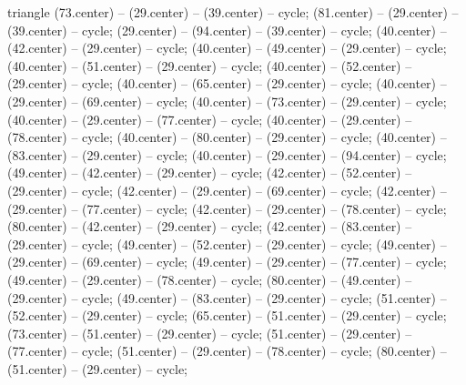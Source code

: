 \begin{pgfonlayer}{triangle}
 (73.center) -- (29.center) -- (39.center) -- cycle; 
 (81.center) -- (29.center) -- (39.center) -- cycle; 
 (29.center) -- (94.center) -- (39.center) -- cycle; 
 (40.center) -- (42.center) -- (29.center) -- cycle; 
 (40.center) -- (49.center) -- (29.center) -- cycle; 
 (40.center) -- (51.center) -- (29.center) -- cycle; 
 (40.center) -- (52.center) -- (29.center) -- cycle; 
 (40.center) -- (65.center) -- (29.center) -- cycle; 
 (40.center) -- (29.center) -- (69.center) -- cycle; 
 (40.center) -- (73.center) -- (29.center) -- cycle; 
 (40.center) -- (29.center) -- (77.center) -- cycle; 
 (40.center) -- (29.center) -- (78.center) -- cycle; 
 (40.center) -- (80.center) -- (29.center) -- cycle; 
 (40.center) -- (83.center) -- (29.center) -- cycle; 
 (40.center) -- (29.center) -- (94.center) -- cycle; 
 (49.center) -- (42.center) -- (29.center) -- cycle; 
 (42.center) -- (52.center) -- (29.center) -- cycle; 
 (42.center) -- (29.center) -- (69.center) -- cycle; 
 (42.center) -- (29.center) -- (77.center) -- cycle; 
 (42.center) -- (29.center) -- (78.center) -- cycle; 
 (80.center) -- (42.center) -- (29.center) -- cycle; 
 (42.center) -- (83.center) -- (29.center) -- cycle; 
 (49.center) -- (52.center) -- (29.center) -- cycle; 
 (49.center) -- (29.center) -- (69.center) -- cycle; 
 (49.center) -- (29.center) -- (77.center) -- cycle; 
 (49.center) -- (29.center) -- (78.center) -- cycle; 
 (80.center) -- (49.center) -- (29.center) -- cycle; 
 (49.center) -- (83.center) -- (29.center) -- cycle; 
 (51.center) -- (52.center) -- (29.center) -- cycle; 
 (65.center) -- (51.center) -- (29.center) -- cycle; 
 (73.center) -- (51.center) -- (29.center) -- cycle; 
 (51.center) -- (29.center) -- (77.center) -- cycle; 
 (51.center) -- (29.center) -- (78.center) -- cycle; 
 (80.center) -- (51.center) -- (29.center) -- cycle; 

\end{pgfonlayer}
